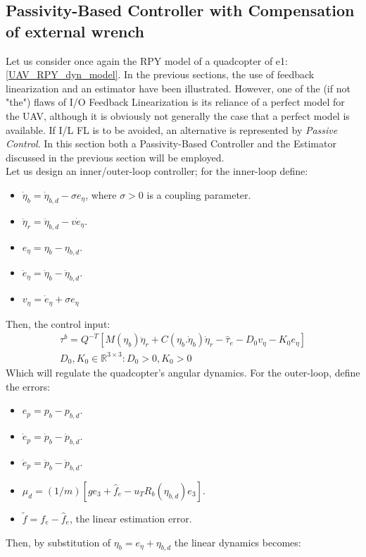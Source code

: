 \subsection{Passivity-Based Controller with Compensation of external wrench}
Let us consider once again the RPY model of a quadcopter of e1:\ref{UAV_RPY_dyn_model}. In the previous sections, the use of feedback linearization and an estimator have been illustrated. However, one of the (if not "the") flaws of I/O Feedback Linearization is its reliance of a perfect model for the UAV, although it is obviously not generally the case that a perfect model is available. If I/L FL is to be avoided, an alternative is represented by \textit{Passive Control}. In this section both a Passivity-Based Controller and the Estimator discussed in the previous section will be employed.\\
Let us design an inner/outer-loop controller; for the inner-loop define:
\begin{itemize}
    \item $\dot{\eta}_b=\dot{\eta}_{b,d}-\sigma e_\eta$, where $\sigma>0$ is a coupling parameter.
    \item $\ddot{\eta}_{r}=\ddot{\eta}_{b,d}-v\dot{e}_\eta$.
    \item $e_\eta=\eta_b-\eta_{b,d}$.
    \item $\dot{e}_\eta=\dot{\eta}_b-\dot{\eta}_{b,d}$.
    \item $v_\eta=\dot{e}_\eta+\sigma e_\eta$
\end{itemize}
Then, the control input:
\begin{gather*}
    \tau^b=Q^{-T}\left[ M(\eta_{b})\ddot{\eta}_{r}+C(\eta_b.\dot{\eta}_b)\dot{\eta}_r-\hat{\tau}_e-D_0v_\eta-K_0e_\eta \right]\\
    D_0,K_0\in\mathbb{R}^{3 \times 3}: D_0>0,K_0>0
\end{gather*}
Which will regulate the quadcopter's angular dynamics. For the outer-loop, define the errors:
\begin{itemize}
    \item $e_p=p_b-p_{b,d}$.
    \item $\dot{e}_p=\dot{p}_b-\dot{p}_{b,d}$.
    \item $\ddot{e}_p=\ddot{p}_b-\ddot{p}_{b,d}$.
    \item $\mu_d=(1/m)\left[ge_3+\hat{f}_e-u_{T}R_b(\eta_{b,d})e_3\right]$.
    \item $\tilde{f}=f_e-\hat{f}_e$, the linear estimation error.
\end{itemize}
Then, by substitution of $\eta_b=e_\eta+\eta_{b,d}$ the linear dynamics becomes:
